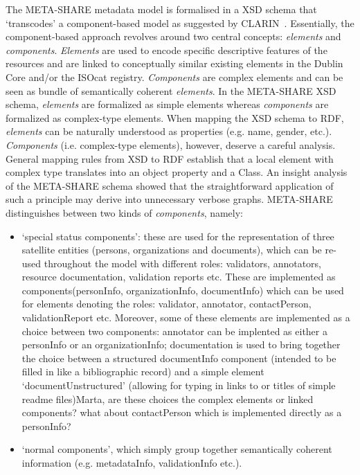 \documentclass{llncs}
\begin{document}
{The META-SHARE metadata model is formalised in a XSD schema that `transcodes' a component-based model as suggested by CLARIN~\cite{broeder2012cmdi}. Essentially, the component-based approach revolves around two central concepts: \emph{elements} and \emph{components}. \emph{Elements} are used to encode specific descriptive features of the resources and are linked to conceptually similar existing elements in the Dublin Core and/or the ISOcat registry. \emph{Components} are complex elements and can be seen as bundle of semantically coherent \emph{elements}.
In the META-SHARE XSD schema, \emph{elements} are formalized as simple elements whereas \emph{components} are formalized as complex-type elements. When mapping the XSD schema to RDF, \emph{elements} can be naturally understood as properties (e.g. name, gender, etc.). \emph{Components} (i.e. complex-type elements), however, deserve a careful analysis. General mapping rules from XSD to RDF establish that a local element with complex type translates into an object property and a Class. An insight analysis of the META-SHARE schema showed that the straightforward application of such a principle may derive into unnecessary verbose graphs.
META-SHARE distinguishes between two kinds of \emph{components}, namely:
\begin{itemize}
\item `special status components': these are used for the representation of
    three satellite entities (persons, organizations and documents), which can
    be re-used throughout the model with different roles: validators,
    annotators, resource documentation, validation reports etc. These are
    implemented as components(personInfo, organizationInfo, documentInfo) which
    can be used for elements denoting the roles: validator, annotator,
    contactPerson, validationReport etc. Moreover, some of these elements are
    implemented as a choice between two components: annotator can be implented
    as either a personInfo or an organizationInfo; documentation is used to
    bring together the choice between a structured documentInfo component
    (intended to be filled in like a bibliographic record) and a simple element
    `documentUnstructured' (allowing for typing in links to or titles of simple readme files){Marta, are these choices the complex elements or linked components? what about contactPerson which is implemented directly as a personInfo?}
\item `normal components', which simply group together semantically coherent information (e.g. metadataInfo, validationInfo etc.).
\end{itemize}

}
\end{document}
